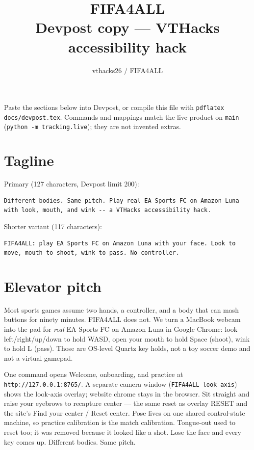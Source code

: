 \documentclass[11pt]{article}
\title{FIFA4ALL\\[0.4em]
\large Devpost copy --- VTHacks accessibility hack}
\author{vthacks26 / FIFA4ALL}
\date{}
\begin{document}
\maketitle

\noindent
Paste the sections below into Devpost, or compile this file with
\texttt{pdflatex docs/devpost.tex}.
Commands and mappings match the live product on \texttt{main}
(\texttt{python -m tracking.live}); they are not invented extras.

\section{Tagline}

Primary (127 characters, Devpost limit 200):

\begin{verbatim}
Different bodies. Same pitch. Play real EA Sports FC on Amazon Luna with look, mouth, and wink -- a VTHacks accessibility hack.
\end{verbatim}

Shorter variant (117 characters):

\begin{verbatim}
FIFA4ALL: play EA Sports FC on Amazon Luna with your face. Look to move, mouth to shoot, wink to pass. No controller.
\end{verbatim}

\section{Elevator pitch}

Most sports games assume two hands, a controller, and a body that can mash
buttons for ninety minutes. FIFA4ALL does not. We turn a MacBook webcam into
the pad for \emph{real} EA Sports FC on Amazon Luna in Google Chrome: look
left/right/up/down to hold WASD, open your mouth to hold Space (shoot), wink
to hold L (pass). Those are OS-level Quartz key holds, not a toy soccer demo
and not a virtual gamepad.

One command opens Welcome, onboarding, and practice at
\texttt{http://127.0.0.1:8765/}. A separate camera window
(\texttt{FIFA4ALL look axis}) shows the look-axis overlay; website chrome
stays in the browser. Sit straight and raise your eyebrows to recapture
center --- the same reset as overlay RESET and the site's Find your center /
Reset center. Pose lives on one shared control-state machine, so
practice calibration is the match calibration. Tongue-out used to reset too;
it was removed because it looked like a shot. Lose the face and every key
comes up. Different bodies. Same pitch.
\end{document}
